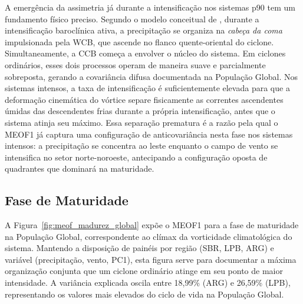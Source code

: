 A emergência da assimetria já durante a intensificação nos sistemas p90 tem um fundamento físico preciso. 
Segundo o modelo conceitual de \citet{browning1986conceptual}, durante a intensificação baroclínica ativa, a precipitação se organiza na \textit{cabeça da coma} impulsionada pela WCB, que ascende no flanco quente-oriental do ciclone. 
Simultaneamente, a CCB começa a envolver o núcleo do sistema. 
Em ciclones ordinários, esses dois processos operam de maneira suave e parcialmente sobreposta, gerando a covariância difusa documentada na População Global. 
Nos sistemas intensos, a taxa de intensificação é suficientemente elevada para que a deformação cinemática do vórtice separe fisicamente as correntes ascendentes úmidas das descendentes frias durante a própria intensificação, antes que o sistema atinja seu máximo. 
Essa separação prematura é a razão pela qual o MEOF1 já captura uma configuração de anticovariância nesta fase nos sistemas intensos: a precipitação se concentra ao leste enquanto o campo de vento se intensifica no setor norte-noroeste, antecipando a configuração oposta de quadrantes que dominará na maturidade.

\subsection{Fase de Maturidade}
\label{subsec:meof_madurez}

A Figura~\ref{fig:meof_madurez_global} expõe o MEOF1 para a fase de maturidade na População Global, correspondente ao clímax da vorticidade climatológica do sistema. 
Mantendo a disposição de painéis por região (SBR, LPB, ARG) e variável (precipitação, vento, PC1), esta figura serve para documentar a máxima organização conjunta que um ciclone ordinário atinge em seu ponto de maior intensidade. 
A variância explicada oscila entre 18,99\% (ARG) e 26,59\% (LPB), representando os valores mais elevados do ciclo de vida na População Global.

